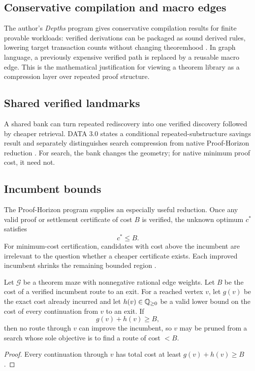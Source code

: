 \subsection{Conservative compilation and macro edges}
The author's \emph{Depths} program gives conservative compilation results for finite provable workloads: verified derivations can be packaged as sound derived rules, lowering target transaction counts without changing theoremhood \cite{depths}. In graph language, a previously expensive verified path is replaced by a reusable macro edge. This is the mathematical justification for viewing a theorem library as a compression layer over repeated proof structure.

\subsection{Shared verified landmarks}
A shared bank can turn repeated rediscovery into one verified discovery followed by cheaper retrieval. DATA 3.0 states a conditional repeated-substructure savings result and separately distinguishes search compression from native Proof-Horizon reduction \cite{data3}. For search, the bank changes the geometry; for native minimum proof cost, it need not.

\subsection{Incumbent bounds}
The Proof-Horizon program supplies an especially useful reduction. Once any valid proof or settlement certificate of cost $B$ is verified, the unknown optimum $c^*$ satisfies
\[
c^*\le B.
\]
For minimum-cost certification, candidates with cost above the incumbent are irrelevant to the question whether a cheaper certificate exists. Each improved incumbent shrinks the remaining bounded region \cite{horizon,data201}.

\begin{proposition}
Let $\mathcal G$ be a theorem maze with nonnegative rational edge weights. Let $B$ be the cost of a verified incumbent route to an exit. For a reached vertex $v$, let $g(v)$ be the exact cost already incurred and let $h(v)\in\mathbb{Q}_{\ge 0}$ be a valid lower bound on the cost of every continuation from $v$ to an exit. If
\[
g(v)+h(v)\ge B,
\]
then no route through $v$ can improve the incumbent, so $v$ may be pruned from a search whose sole objective is to find a route of cost $<B$.
\end{proposition}
\begin{proof}
Every continuation through $v$ has total cost at least $g(v)+h(v)\ge B$.
\end{proof}

